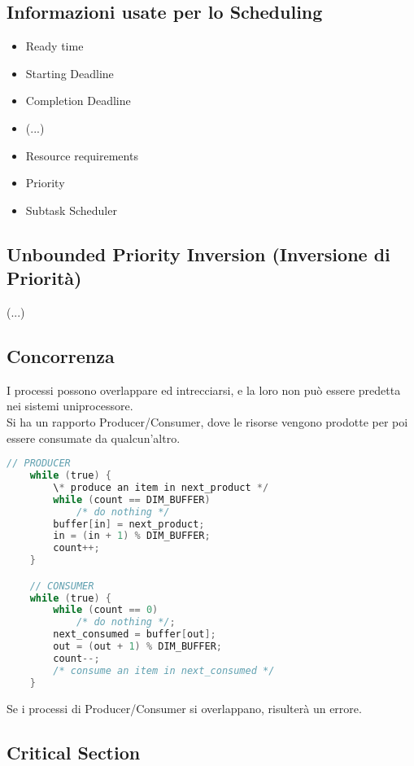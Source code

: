 \documentclass[12pt, a4paper]{article}
\begin{document}
	\subsection*{Informazioni usate per lo Scheduling}
	\begin{itemize}
		\item Ready time
		\item Starting Deadline
		\item Completion Deadline
		\item (...)
		\item Resource requirements
		\item Priority
		\item Subtask Scheduler
	\end{itemize}
	
	
	\subsection*{Unbounded Priority Inversion (Inversione di Priorità)}
	
	(...)
	\\
	
	
	\subsection*{Concorrenza}
	I processi possono overlappare ed intrecciarsi, e la loro  non può essere predetta nei sistemi uniprocessore.
	\\
	Si ha un rapporto Producer/Consumer, dove le risorse vengono prodotte per poi essere consumate da qualcun'altro.
	
	\begin{lstlisting}[language=C]
	// PRODUCER
	while (true) {
		\* produce an item in next_product */
		while (count == DIM_BUFFER)
			/* do nothing */
		buffer[in] = next_product;
		in = (in + 1) % DIM_BUFFER;
		count++;
	}

	// CONSUMER
	while (true) {
		while (count == 0)
			/* do nothing */;
		next_consumed = buffer[out];
		out = (out + 1) % DIM_BUFFER;
		count--;
		/* consume an item in next_consumed */
	}
	\end{lstlisting}

	Se i processi di Producer/Consumer si overlappano, risulterà un errore.
	
	
	\subsection*{Critical Section}
	
\end{document}
